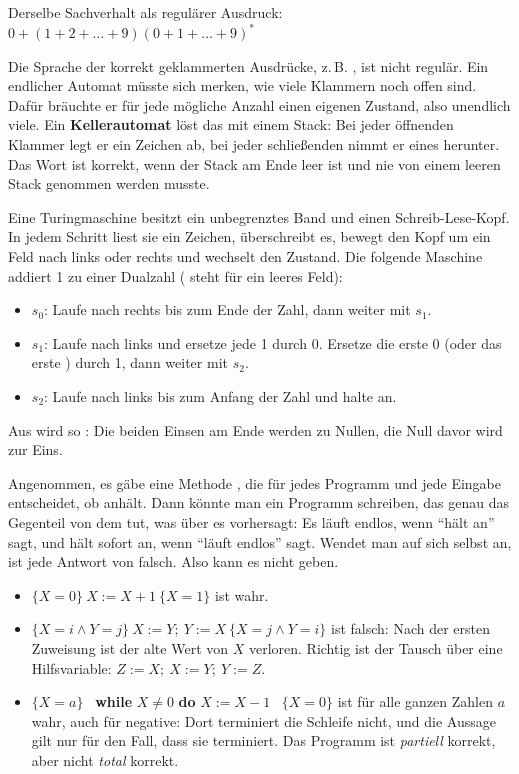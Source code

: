 \smallskip
Derselbe Sachverhalt als regulärer Ausdruck: \ $0 + (1 + 2 + \ldots + 9)(0 + 1 + \ldots + 9)^*$

Die Sprache der korrekt geklammerten Ausdrücke, z.\,B. \code{(()())}, ist nicht regulär. Ein endlicher Automat müsste sich merken, wie viele Klammern noch offen sind. Dafür bräuchte er für jede mögliche Anzahl einen eigenen Zustand, also unendlich viele. Ein \textbf{Kellerautomat} löst das mit einem Stack: Bei jeder öffnenden Klammer legt er ein Zeichen ab, bei jeder schließenden nimmt er eines herunter. Das Wort ist korrekt, wenn der Stack am Ende leer ist und nie von einem leeren Stack genommen werden musste.

Eine Turingmaschine besitzt ein unbegrenztes Band und einen Schreib-Lese-Kopf. In jedem Schritt liest sie ein Zeichen, überschreibt es, bewegt den Kopf um ein Feld nach links oder rechts und wechselt den Zustand. Die folgende Maschine addiert 1 zu einer Dualzahl (\code{\#} steht für ein leeres Feld):
\begin{itemize}[itemsep=0.1em]
\item $s_0$: Laufe nach rechts bis zum Ende der Zahl, dann weiter mit $s_1$.
\item $s_1$: Laufe nach links und ersetze jede 1 durch 0. Ersetze die erste 0 (oder das erste \code{\#}) durch 1, dann weiter mit $s_2$.
\item $s_2$: Laufe nach links bis zum Anfang der Zahl und halte an.
\end{itemize}
Aus  wird so : Die beiden Einsen am Ende werden zu Nullen, die Null davor wird zur Eins.

Angenommen, es gäbe eine Methode , die für jedes Programm  und jede Eingabe  entscheidet, ob  anhält. Dann könnte man ein Programm  schreiben, das genau das Gegenteil von dem tut, was  über es vorhersagt: Es läuft endlos, wenn  \enquote{hält an} sagt, und hält sofort an, wenn  \enquote{läuft endlos} sagt. Wendet man  auf sich selbst an, ist jede Antwort von  falsch. Also kann es  nicht geben.

\begin{itemize}[itemsep=0.1em]
\item $\{X = 0\}\ X := X + 1\ \{X = 1\}$ ist wahr.
\item $\{X = i \wedge Y = j\}\ X := Y;\ Y := X\ \{X = j \wedge Y = i\}$ ist falsch: Nach der ersten Zuweisung ist der alte Wert von $X$ verloren. Richtig ist der Tausch über eine Hilfsvariable: $Z := X;\ X := Y;\ Y := Z$.
\item $\{X = a\}$ \ \textbf{while} $X \neq 0$ \textbf{do} $X := X - 1$ \ $\{X = 0\}$ ist für alle ganzen Zahlen $a$ wahr, auch für negative: Dort terminiert die Schleife nicht, und die Aussage gilt nur für den Fall, dass sie terminiert. Das Programm ist \emph{partiell} korrekt, aber nicht \emph{total} korrekt.
\end{itemize}


